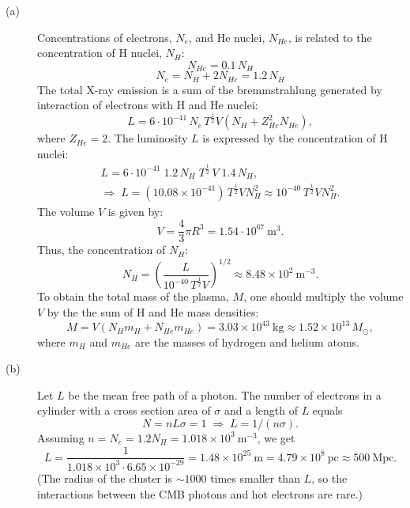 \begin{description}
\item[(a)] Concentrations of electrons, $N_e$, and He nuclei, $N_{He}$, is
  related to the concentration of H nuclei, $N_H$:
  \begin{equation*}
  N_{He} = 0.1\,N_H
  \tag*{(1 point)}
  \end{equation*}
  \begin{equation*}
  N_e = N_H + 2N_{He} = 1.2\,N_H
  \tag*{(2 points)}
  \end{equation*}
  The total X-ray emission is a sum of the bremmstrahlung generated by
  interaction of electrons with H and He nuclei:
  \[
  L = 6 \cdot 10^{-41}\, N_e\, T^{\frac{1}{2}} V \left(N_H + Z_{He}^2 N_{He}\right),
  \]
  where $Z_{He} = 2$. The luminosity $L$ is expressed by the concentration of
  H nuclei:
  \begin{gather*}
  L = 6 \cdot 10^{-41}\; 1.2\,N_H\; T^{\frac{1}{2}}\, V\; 1.4\,N_H, \\
  \Longrightarrow\;
  L = (10.08 \times 10^{-41})\, T^{\frac{1}{2}} V N_H^2
  \approx 10^{-40}\, T^{\frac{1}{2}} V N_H^2.
  \tag*{(3 points)}
  \end{gather*}
  The volume $V$ is given by:
  \begin{equation*}
  V = \frac{4}{3}\pi R^3 = 1.54 \cdot 10^{67}~\mathrm{m^3}.
  \tag*{(3 points)}
  \end{equation*}
  Thus, the concentration of $N_H$:
  \begin{equation*}
  N_H = \left(\frac{L}{10^{-40}\, T^{\frac{1}{2}} V}\right)^{1/2}
  \approx 8.48 \times 10^{2}~\mathrm{m^{-3}}.
  \tag*{(3 points)}
  \end{equation*}
  To obtain the total mass of the plasma, $M$, one should multiply the volume
  $V$ by the the sum of H and He mass densities:
  \begin{equation*}
  M = V\left(N_H m_H + N_{He} m_{He}\right)
  = 3.03 \times 10^{43}~\mathrm{kg}
  \approx 1.52 \times 10^{13}\,M_\odot,
  \tag*{(4 points)}
  \end{equation*}
  where $m_H$ and $m_{He}$ are the masses of hydrogen and helium atoms.

\item[(b)] Let $L$ be the mean free path of a photon. The number of electrons
  in a cylinder with a cross section area of $\sigma$ and a length of $L$
  equals
  \[
  N = nL\sigma = 1 \;\Longrightarrow\; L = 1/(n\sigma).
  \]
  Assuming $n = N_e = 1.2 N_H = 1.018 \times 10^{3}~\mathrm{m^{-3}}$, we get
  \begin{equation*}
  L = \frac{1}{1.018 \times 10^{3} \cdot 6.65 \times 10^{-29}}
  = 1.48 \times 10^{25}~\mathrm{m}
  = 4.79 \times 10^{8}~\mathrm{pc}
  \approx 500~\mathrm{Mpc}.
  \tag*{(5 points)}
  \end{equation*}
  (The radius of the cluster is $\sim 1000$ times smaller than $L$, so the
  interactions between the CMB photons and hot electrons are rare.)


\end{description}
